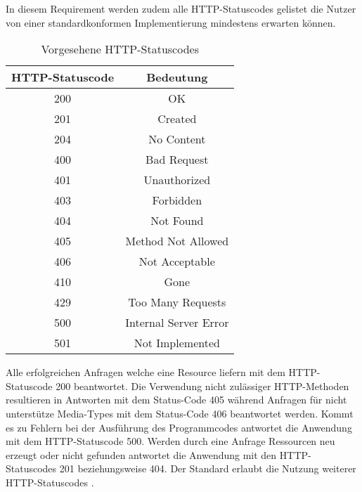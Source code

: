 In diesem Requirement werden zudem alle HTTP-Statuscodes gelistet die Nutzer von einer standardkonformen Implementierung mindestens erwarten können. 
\begin{table}[H]
    \caption{Vorgesehene HTTP-Statuscodes \cite{ogc_api_processes_core}}
    \centering
    \begin{tabular}{c c} 
        HTTP-Statuscode & Bedeutung\\ 
        \hline
        200 & OK\\
        201 & Created\\
        204 & No Content\\
        400 & Bad Request\\
        401 & Unauthorized\\
        403 & Forbidden\\
        404 & Not Found\\
        405 & Method Not Allowed\\
        406 & Not Acceptable\\
        410 & Gone\\
        429 & Too Many Requests\\
        500 & Internal Server Error\\
        501 & Not Implemented\\
    \end{tabular}\label{httpcodes}
\end{table}
Alle erfolgreichen Anfragen welche eine Resource liefern mit dem HTTP-Statuscode 200 beantwortet. Die Verwendung nicht zulässiger HTTP-Methoden resultieren 
in Antworten mit dem Status-Code 405 während Anfragen für nicht unterstütze Media-Types mit dem Status-Code 406 beantwortet werden. Kommt es zu Fehlern bei der Ausführung 
des Programmcodes antwortet die Anwendung mit dem HTTP-Statuscode 500. Werden durch eine Anfrage Ressourcen neu erzeugt oder nicht gefunden antwortet die Anwendung mit 
den HTTP-Statuscodes 201 beziehungsweise 404. Der Standard erlaubt die Nutzung weiterer HTTP-Statuscodes \cite{ogc_api_processes_core}.

